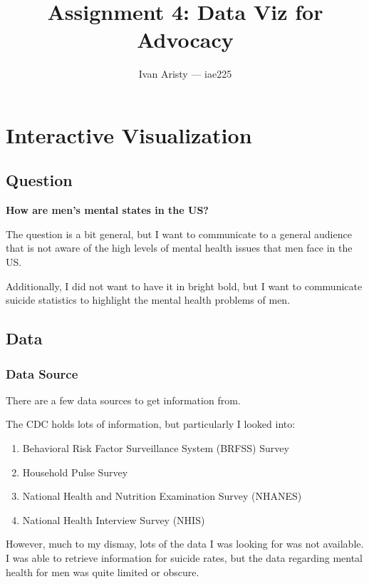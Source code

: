 \documentclass{article}
\title{Assignment 4: Data Viz for Advocacy}
\author{Ivan Aristy — iae225}
\begin{document}
  \maketitle %
  \thispagestyle{empty}

\section{Interactive Visualization}

\subsection{Question}
\label{subsec:subsec1}

\textbf{How are men's mental states in the US?}

The question is a bit general, but I want to communicate to a general audience
that is not aware of the high levels of mental health issues that men face in the US.

Additionally, I did not want to have it in bright bold, but I want to communicate
suicide statistics to highlight the mental health problems of men.

\subsection{Data}
\label{subsec:subsec2}

\subsubsection{Data Source}
\label{subsubsec:Data Source}

There are a few data sources to get information from.

The CDC holds lots of information, but particularly I looked into:

\begin{enumerate}
  \item Behavioral Risk Factor Surveillance System (BRFSS) Survey
  \item Household Pulse Survey
  \item National Health and Nutrition Examination Survey (NHANES)
  \item National Health Interview Survey (NHIS)
\end{enumerate}

However, much to my dismay, lots of the data I was looking for 
was not available. I was able to retrieve information for suicide rates,
but the data regarding mental health for men was quite limited or obscure.
\end{document}
